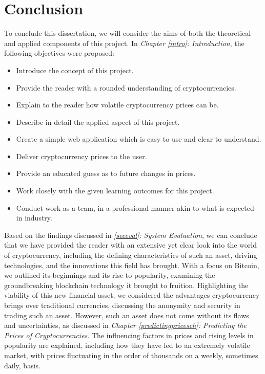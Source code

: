 \chapter{Conclusion}\label{conclusionch}

To conclude this dissertation, we will consider the aims of both the theoretical and applied components of this project. In \textit{Chapter \ref{intro}: Introduction}, the following objectives were proposed:

\begin{itemize}
    \item Introduce the concept of this project.
    \item Provide the reader with a rounded understanding of cryptocurrencies.
    \item Explain to the reader how volatile cryptocurrency prices can be.
    \item Describe in detail the applied aspect of this project.
    \item Create a simple web application which is easy to use and clear to understand.
    \item Deliver cryptocurrency prices to the user.
    \item Provide an educated guess as to future changes in prices.
    \item Work closely with the given learning outcomes for this project.
    \item Conduct work as a team, in a professional manner akin to what is expected in industry.
\end{itemize}

Based on the findings discussed in \textit{\ref{seceval}: System Evaluation}, we can conclude that we have provided the reader with an extensive yet clear look into the world of cryptocurrency, including the defining characteristics of such an asset, driving technologies, and the innovations this field has brought. With a focus on Bitcoin, we outlined its beginnings and its rise to popularity, examining the groundbreaking blockchain technology it brought to fruition. Highlighting the viability of this new financial asset, we considered the advantages cryptocurrency brings over traditional currencies, discussing the anonymity and security in trading such an asset. However, such an asset does not come without its flaws and uncertainties, as discussed in \textit{Chapter \ref{predictingpricesch}: Predicting the Prices of Cryptocurrencies}. The influencing factors in prices and rising levels in popularity are explained, including how they have led to an extremely volatile market, with prices fluctuating in the order of thousands on a weekly, sometimes daily, basis. 

